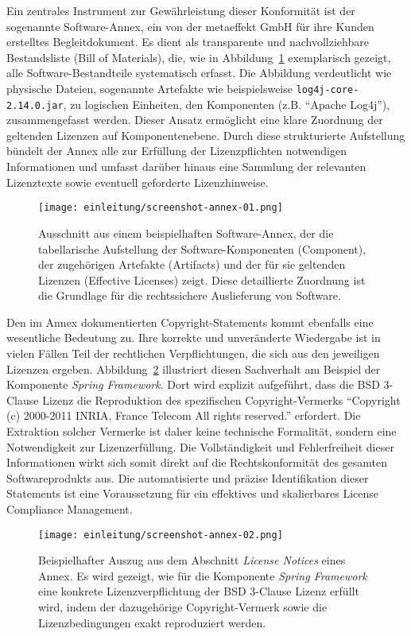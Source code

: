 Ein zentrales Instrument zur Gewährleistung dieser Konformität ist der sogenannte Software-Annex, ein von der metaeffekt GmbH für ihre Kunden erstelltes Begleitdokument.
Es dient als transparente und nachvollziehbare Bestandsliste (Bill of Materials), die, wie in Abbildung~\ref{fig:annex-01} exemplarisch gezeigt, alle Software-Bestandteile systematisch erfasst.
Die Abbildung verdeutlicht wie physische Dateien, sogenannte Artefakte wie beispielsweise \texttt{log4j-core-2.14.0.jar}, zu logischen Einheiten, den Komponenten (z.B. \enquote{Apache Log4j}), zusammengefasst werden.
Dieser Ansatz ermöglicht eine klare Zuordnung der geltenden Lizenzen auf Komponentenebene.
Durch diese strukturierte Aufstellung bündelt der Annex alle zur Erfüllung der Lizenzpflichten notwendigen Informationen und umfasst darüber hinaus eine Sammlung der relevanten Lizenztexte sowie eventuell geforderte Lizenzhinweise.

\begin{figure}[ht]
    \centering
    \texttt{[image: einleitung/screenshot-annex-01.png]}
    \caption{Ausschnitt aus einem beispielhaften Software-Annex, der die tabellarische Aufstellung der Software-Komponenten (Component), der zugehörigen Artefakte (Artifacts) und der für sie geltenden Lizenzen (Effective Licenses) zeigt. Diese detaillierte Zuordnung ist die Grundlage für die rechtssichere Auslieferung von Software.}
    \label{fig:annex-01}
\end{figure}

Den im Annex dokumentierten Copyright-Statements kommt ebenfalls eine wesentliche Bedeutung zu.
Ihre korrekte und unveränderte Wiedergabe ist in vielen Fällen Teil der rechtlichen Verpflichtungen, die sich aus den jeweiligen Lizenzen ergeben.
Abbildung~\ref{fig:annex-02} illustriert diesen Sachverhalt am Beispiel der Komponente \textit{Spring Framework}.
Dort wird explizit aufgeführt, dass die BSD 3-Clause Lizenz die Reproduktion des spezifischen Copyright-Vermerks \enquote{Copyright (c) 2000-2011 INRIA, France Telecom All rights reserved.} erfordert.
Die Extraktion solcher Vermerke ist daher keine technische Formalität, sondern eine Notwendigkeit zur Lizenzerfüllung.
Die Vollständigkeit und Fehlerfreiheit dieser Informationen wirkt sich somit direkt auf die Rechtskonformität des gesamten Softwareprodukts aus.
Die automatisierte und präzise Identifikation dieser Statements ist eine Voraussetzung für ein effektives und skalierbares License Compliance Management.

\begin{figure}[ht]
    \centering
    \texttt{[image: einleitung/screenshot-annex-02.png]}
    \caption{Beispielhafter Auszug aus dem Abschnitt \textit{License Notices} eines Annex. Es wird gezeigt, wie für die Komponente \textit{Spring Framework} eine konkrete Lizenzverpflichtung der BSD 3-Clause Lizenz erfüllt wird, indem der dazugehörige Copyright-Vermerk sowie die Lizenzbedingungen exakt reproduziert werden.}
    \label{fig:annex-02}
\end{figure}

